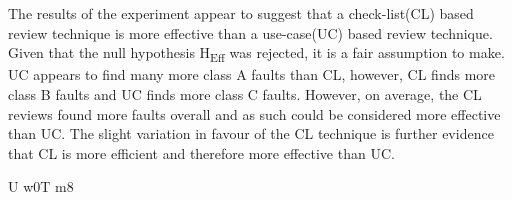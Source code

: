 \documentclass[10pt,twocolumn]{article}
\begin{document}
The results of the experiment appear to suggest that a check-list(CL) based review technique is more effective than a use-case(UC) based review technique. Given that the null hypothesis H\textsubscript{Eff} was rejected, it is a fair assumption to make. UC appears to find many more class A faults than CL, however, CL finds more class B faults and UC finds more class C faults. However, on average, the CL reviews found more faults overall and as such could be considered more effective than UC. The slight variation in favour of the CL technique is further evidence that CL is more efficient and therefore more effective than UC.








U w0T m8
\end{document}
